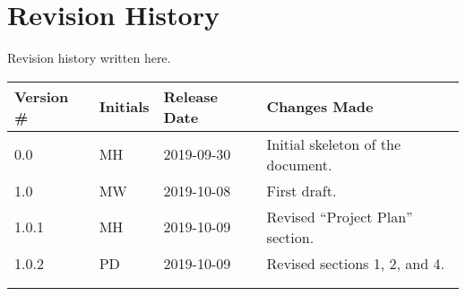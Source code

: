 \thispagestyle{empty}
\section*{Revision History}

Revision history written here.

\begin{table}[H]
\begin{tabular}{llll}
\hline
Version \# & Initials & Release Date & Changes Made \\ \hline
0.0 & MH & 2019-09-30 & Initial skeleton of the document.\\
1.0 & MW & 2019-10-08 & First draft.\\
1.0.1 & MH & 2019-10-09 & Revised ``Project Plan'' section.\\
1.0.2 & PD & 2019-10-09 & Revised sections 1, 2, and 4.\\
 & & & \\
 & & & \\ \hline
\end{tabular}
\end{table}